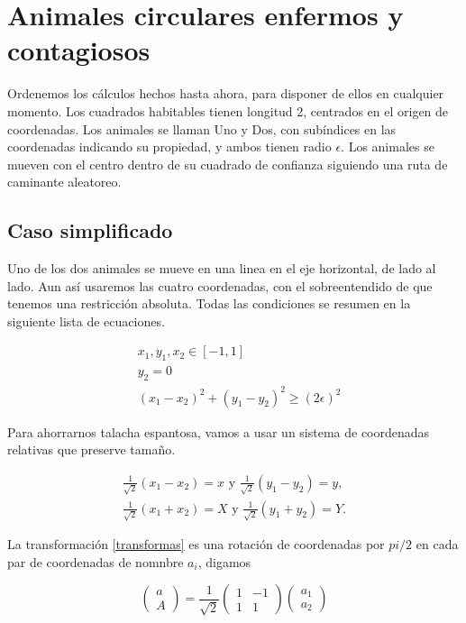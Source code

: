 \documentclass[letterpaper,10pt]{article}
\begin{document}
\section{Animales circulares enfermos y contagiosos}

Ordenemos los cálculos hechos hasta ahora, para disponer de ellos
en cualquier momento. 
Los cuadrados habitables tienen longitud 2, centrados en el
origen de coordenadas. 
Los animales se llaman Uno y Dos, con subíndices 
en las coordenadas indicando su propiedad, y
ambos tienen radio $\epsilon$.
Los animales se mueven con el centro
dentro de su cuadrado de confianza
siguiendo una ruta de caminante aleatoreo.

\subsection{Caso simplificado}

Uno de los dos animales se mueve en una linea en el eje 
horizontal, de lado al lado. Aun así usaremos las cuatro
coordenadas, con el sobreentendido de que tenemos una
restricción absoluta.
Todas las condiciones se resumen en la siguiente
lista de ecuaciones.

\begin{align}
& x_1, y_1, x_2 \in [-1,1] \\
& y_2=0 \\
& (x_1-x_2)^2+(y_1-y_2)^2 \geq (2\epsilon)^2 \label{circle}
\end{align}

Para ahorrarnos talacha espantosa,
vamos a usar un sistema de coordenadas relativas
que preserve tamaño.

\begin{align} \label{transformas}
 \frac{1}{\sqrt{2}}(x_1-x_2)=x \text{ y } 
\frac{1}{\sqrt{2}}(y_1-y_2)=y, \\
\frac{1}{\sqrt{2}}(x_1+x_2)=X \text{ y } 
\frac{1}{\sqrt{2}}(y_1+y_2)=Y. 
\end{align}

La transformación \ref{transformas} es
una rotación de coordenadas por $pi/2$ en 
cada par de coordenadas de nomnbre $a_i$, digamos

\begin{equation}
  \begin{pmatrix}
    a \\
    A
  \end{pmatrix}
  =\frac{1}{\sqrt{2}}
  \begin{pmatrix}
    1 & -1 \\
    1 & 1
  \end{pmatrix}
  \begin{pmatrix}
    a_1 \\
    a_2
  \end{pmatrix}
\end{equation}
\end{document}

